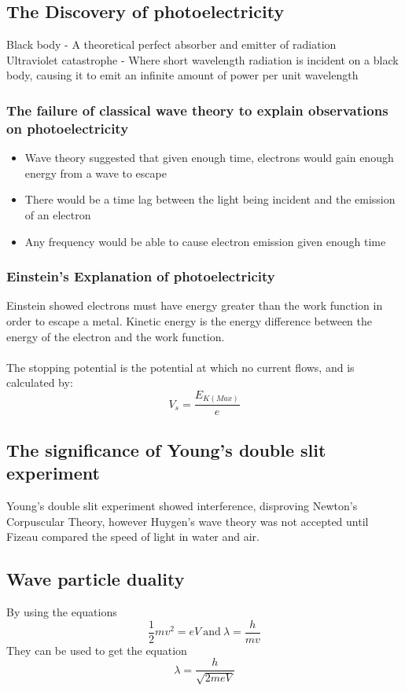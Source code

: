 \documentclass[12pt]{article}
\begin{document}
\subsection{The Discovery of photoelectricity}
Black body - A theoretical perfect absorber and emitter of radiation\\
Ultraviolet catastrophe - Where short wavelength radiation is incident on a black body, causing it to emit an infinite amount of power per unit wavelength
\subsubsection{The failure of classical wave theory to explain observations on photoelectricity}
\begin{itemize}
\item Wave theory suggested that given enough time, electrons would gain enough energy from a wave to escape
\item There would be a time lag between the light being incident and the emission of an electron
\item Any frequency would be able to cause electron emission given enough time
\end{itemize}
\subsubsection{Einstein's Explanation of photoelectricity}
Einstein showed electrons must have energy greater than the work function in order to escape a metal. Kinetic energy is the energy difference between the energy of the electron and the work function.\\
\\
The stopping potential is the potential at which no current flows, and is calculated by:
$$V_s=\frac{E_{K(Max)}}{e}$$
\subsection{The significance of Young's double slit experiment}
Young's double slit experiment showed interference, disproving Newton's Corpuscular Theory, however Huygen's wave theory was not accepted until Fizeau compared the speed of light in water and air.
\subsection{Wave particle duality}
By using the equations
$$\frac{1}{2}mv^2=eV \ \textrm{and} \ \lambda=\frac{h}{mv}$$
They can be used to get the equation
$$\lambda=\frac{h}{\sqrt{2meV}}$$
\end{document}
